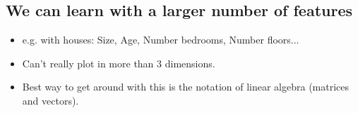 \documentclass{article}
\begin{document}
\subsection*{We can learn with a larger number of features}
\begin{itemize}
  \item e.g. with houses: Size, Age, Number bedrooms, Number floors...
  \item Can't really plot in more than 3 dimensions.
  \item Best way to get around with this is the notation of linear algebra (matrices and vectors).
\end{itemize}
\end{document}
